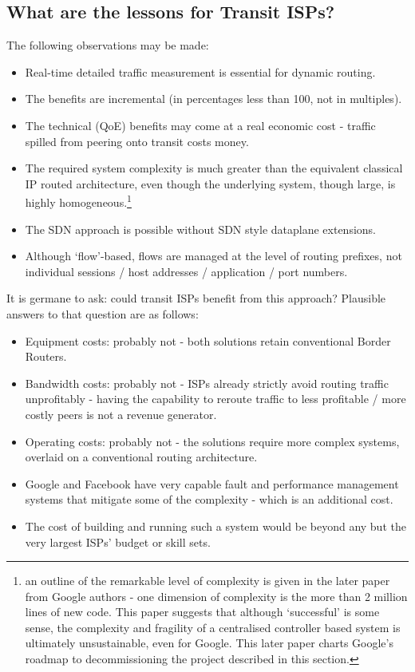 \subsection{What are the lessons for Transit ISPs?}

The following observations may be made:
\begin{itemize}
    \item Real-time detailed traffic measurement is essential for dynamic routing.
    \item The benefits are incremental (in percentages less than 100, not in multiples).
    \item The technical (QoE) benefits may come at a real economic cost - traffic spilled from peering onto transit costs money.
    \item The required system complexity is much greater than the equivalent classical IP routed architecture, even though the underlying system, though large, is highly homogeneous.\footnote{an outline of the remarkable level of complexity is given in the later paper from Google authors \cite{Krentsel2024} - one dimension of complexity is the more than 2 million lines of new code.  This paper suggests that although `successful' is some sense, the complexity and fragility of a centralised controller based system is ultimately unsustainable, even for Google.  This later paper charts Google's roadmap to decommissioning the project described in this section. }
    \item The SDN approach is possible without SDN style dataplane extensions.
    \item Although `flow'-based, flows are managed at the level of routing prefixes, not individual sessions / host addresses / application / port numbers.
\end{itemize}


It is germane to ask: could transit ISPs benefit from this approach?  Plausible answers to that question are as follows:

\begin{itemize}
    \item Equipment costs: probably not - both solutions retain conventional Border Routers.
    \item Bandwidth costs: probably not - ISPs already strictly avoid routing traffic unprofitably - having the capability to reroute traffic to less profitable / more costly peers is not a revenue generator.
    \item Operating costs: probably not - the solutions require more complex systems, overlaid on a conventional routing architecture.
    \item Google and Facebook have very capable fault and performance management systems that mitigate some of the complexity - which is an additional cost.
    \item The cost of building and running such a system would be beyond any but the very largest ISPs' budget or skill sets.
\end{itemize}

